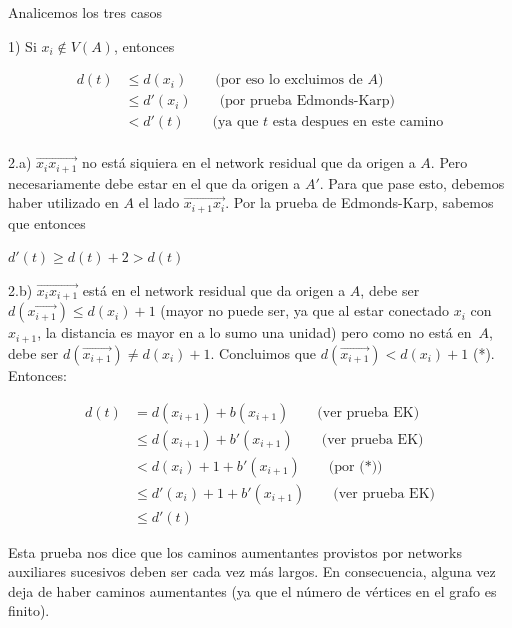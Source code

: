 \documentclass[10pt,a4paper]{article}
\begin{document}
Analicemos los tres casos

1) Si $x_i\not\in V(A)$, entonces

\begin{center}
\begin{align*}
d(t) &\leq d(x_i)\quad\quad\text{(por eso lo excluimos de } A\text{)}\\
&\leq d'(x_i)\quad\quad \text{(por prueba Edmonds-Karp)}\\
&< d'(t) \quad\quad\text{(ya que }t\text{ esta despues en este camino}\\
\end{align*}
\end{center}

2.a) $\overrightarrow{x_ix_{i+1}}$ no está siquiera en el network residual que da origen a $A$. Pero necesariamente debe estar en el que da origen a $A'$. Para que pase esto, debemos haber utilizado en $A$ el lado $\overrightarrow{x_{i+1}x_{i}}$. Por la prueba de Edmonds-Karp, sabemos que entonces

\begin{center}
$d'(t) \geq d(t) + 2 > d(t)$
\end{center}

2.b) $\overrightarrow{x_ix_{i+1}}$ está en el network residual que da origen a $A$, debe ser $d(\overrightarrow{x_{i+1}})\leq d(x_i) + 1$ (mayor no puede ser, ya que al estar conectado $x_{i}$ con $x_{i+1}$, la distancia es mayor en a lo sumo una unidad) pero como no está en $A$, debe ser $d(\overrightarrow{x_{i+1}})\neq d(x_i) + 1$. Concluimos que $d(\overrightarrow{x_{i+1}})< d(x_i) + 1$ (*). Entonces:

\begin{center}
\begin{align*}
d(t) &= d(x_{i+1}) + b(x_{i+1})\quad \quad \text{(ver prueba EK)}\\
&\leq d(x_{i+1})+b'(x_{i+1})\quad \quad \text{(ver prueba EK)}\\
&< d(x_i)+1+b'(x_{i+1})\quad \quad \text{(por (*))}\\
&\leq d'(x_i)+1+b'(x_{i+1})\quad \quad \text{(ver prueba EK)}\\
&\leq d'(t)
\end{align*}
\end{center}

Esta prueba nos dice que los caminos aumentantes provistos por networks auxiliares sucesivos deben ser cada vez más largos. En consecuencia, alguna vez deja de haber caminos aumentantes (ya que el número de vértices en el grafo es finito).
\end{document}
